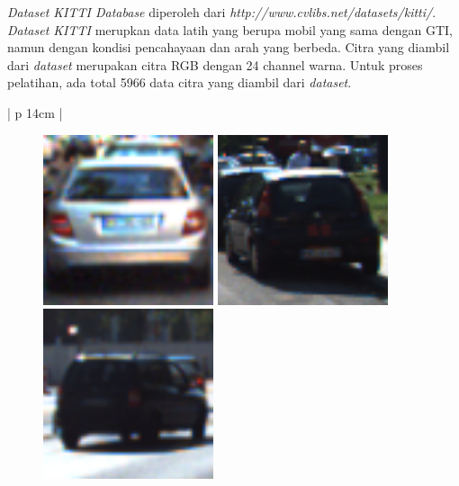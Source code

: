 \textit{Dataset KITTI Database} diperoleh dari \textit{http://www.cvlibs.net/datasets/kitti/}. \textit{Dataset KITTI} merupkan data latih yang berupa mobil yang sama dengan GTI, namun dengan kondisi pencahayaan dan arah yang berbeda. Citra yang diambil dari \textit{dataset} merupakan citra RGB dengan 24 channel warna. Untuk proses pelatihan, ada total 5966 data citra yang diambil dari \textit{dataset}.

\begin{table}[H]
	\small
	\begin{adjustbox}{width=1\textwidth}
		\begin{tabular}{| p {14cm} |}
			\hline
			\begin{figure}[H]
				\centering
				{\includegraphics[width = 5cm]{images/DatasetKITTILatihMobil}}
				{\includegraphics[width = 5cm]{images/DatasetKITTILatihMobil1}}
				{\includegraphics[width = 5cm]{images/DatasetKITTILatihMobil2}}
			\end{figure} \\
			\hline
		\end{tabular}
	\end{adjustbox}
	\label{fig:ContohKITTI}
\end{table}

